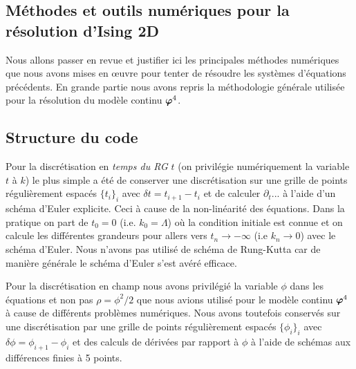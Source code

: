 \documentclass[10.5pt]{article}
\begin{document}
\begin{multicols}{2}
\section{Méthodes et outils numériques pour la résolution d'Ising 2D}

\label{sec:NumIsing}
Nous allons passer en revue et justifier ici les principales méthodes numériques que nous avons mises en œuvre pour tenter de résoudre les systèmes d'équations précédents. En grande partie nous avons repris la méthodologie générale utilisée pour la résolution du modèle continu $\boldsymbol{ \varphi}^4$.


\subsection{Structure du code}

Pour la discrétisation en \textit{temps du RG} $t$ (on privilégie numériquement la variable $t$ à $k$) le plus simple a été de conserver une discrétisation sur une grille de points régulièrement espacés $\{t_i\}_i$ avec $ \delta t = t_{i+1} - t_i$ et de calculer $\partial_t ...$ à l'aide d'un schéma d'Euler explicite. Ceci à cause de la non-linéarité des équations. Dans la pratique on part de $t_0=0$ (i.e. $k_0 = \Lambda$) où la condition initiale est connue et on calcule les différentes grandeurs pour allers vers $t_n \to - \infty$ (i.e $k_n \to 0$) avec le schéma d'Euler. Nous n'avons pas utilisé de schéma de Rung-Kutta car de manière générale le schéma d'Euler s'est avéré efficace.

Pour la discrétisation en champ nous avons privilégié la variable $\phi$ dans les équations et non pas $\rho = \phi^2/2$ que nous avions utilisé pour le modèle continu $\boldsymbol{ \varphi}^4$ à cause de différents problèmes numériques. Nous avons toutefois conservés sur une discrétisation par une grille de points régulièrement espacés $\{\phi_i\}_i$ avec $\delta \phi = \phi_{i+1} - \phi_i$ et des calculs de dérivées par rapport à $\phi$ à l'aide de schémas aux différences finies à 5 points. \\



\end{multicols}
\end{document}
